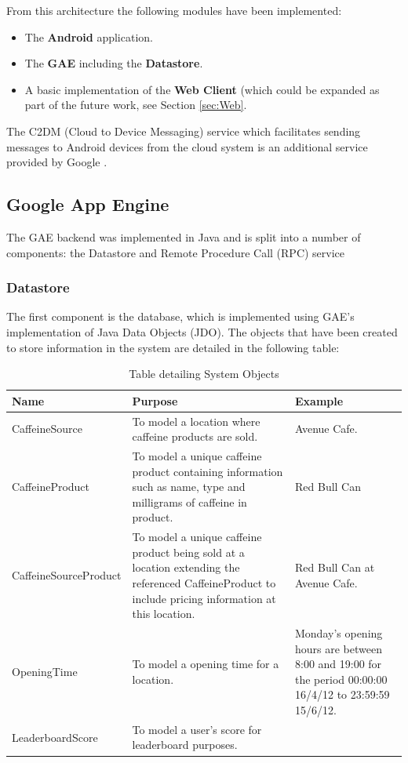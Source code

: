 From this architecture the following modules have been implemented: 
\begin{itemize}
	\item{The \textbf{Android} application.}
	\item{The \textbf{GAE} including the \textbf{Datastore}.}
	\item{A basic implementation of the \textbf{Web Client} \cite{implementation} (which could be expanded as part of the future work, see Section \ref{sec:Web}.}
\end{itemize}

The C2DM (Cloud to Device Messaging) service which facilitates sending messages to Android devices from the cloud system is an additional service provided by Google \cite{implementation}. 

\subsection{Google App Engine}
The GAE backend was implemented in Java and is split into a number of components: the Datastore and Remote Procedure Call (RPC) service

\subsubsection{Datastore}
The first component is the database, which is implemented using GAE’s implementation of Java Data Objects (JDO). 
The objects that have been created to store information in the system are detailed in the following table:

\begin{table}[ht]
\begin{tabular}{|p{110pt}|p{200pt}|p{110pt}|}
\hline
Name			& Purpose		 									& Example	
\\\hline
CaffeineSource		& To model a location where caffeine products are sold.	& Avenue Cafe.
\\\hline
CaffeineProduct	& To model a unique caffeine product containing information such as name, type and milligrams of caffeine in product.	& Red Bull Can
\\\hline
CaffeineSourceProduct	& To model a unique caffeine product being sold at a location extending the referenced CaffeineProduct to include pricing information at this location.	& Red Bull Can at \newline Avenue Cafe.
\\\hline
OpeningTime		& To model a opening time for a location.	& Monday’s opening hours are between 8:00 and 19:00 for the period 00:00:00 16/4/12 to 23:59:59 15/6/12. 
\\\hline
LeaderboardScore	& To model a user’s score for leaderboard purposes.	&
\\\hline
\end{tabular}
\caption{Table detailing System Objects}
\end{table}

